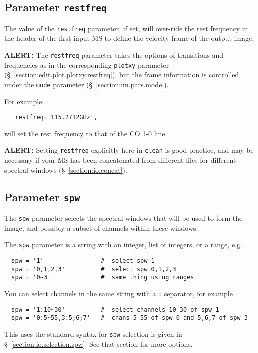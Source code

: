 \subsection{Parameter {\tt restfreq} }
\label{section:im.pars.restfreq}

The value of the {\tt restfreq} parameter, if set, will over-ride
the rest frequency in the header of the first input MS to define
the velocity frame of the output image.

{\bf ALERT:} The {\tt restfreq} parameter takes the options
of transitions and frequencies as in the corresponding {\tt plotxy}
parameter (\S~\ref{section:edit.plot.plotxy.restfreq}), but the
frame information is controlled under the {\tt mode} parameter
(\S~\ref{section:im.pars.mode}).

For example:
\small
\begin{verbatim}
   restfreq='115.2712GHz',
\end{verbatim}
\normalsize
will set the rest frequency to that of the CO 1-0 line.

{\bf ALERT:} Setting {\tt restfreq} explicitly here in
{\tt clean} is good practice, and may be necessary if your MS has
been concatenated from different files for different spectral
windows (\S~\ref{section:io.concat}).

\subsection{Parameter {\tt spw} }
\label{section:im.pars.spw}

The {\tt spw} parameter selects the spectral windows that will
be used to form the image, and possibly a subset of channels
within these windows.

The {\tt spw} parameter is a string with an integer, list
of integers, or a range, e.g.  
\small
\begin{verbatim}
  spw = '1'                #  select spw 1
  spw = '0,1,2,3'          #  select spw 0,1,2,3
  spw = '0~3'              #  same thing using ranges
\end{verbatim}
\normalsize
You can select channels in the same string with a {\tt :} separator,
for example
\small
\begin{verbatim}
  spw = '1:10~30'          #  select channels 10-30 of spw 1
  spw = '0:5~55,3:5;6;7'   #  chans 5-55 of spw 0 and 5,6,7 of spw 3
\end{verbatim}
\normalsize
This uses the standard syntax for {\tt spw} selection is given in 
\S~\ref{section:io.selection.spw}.  See that section for more
options.

